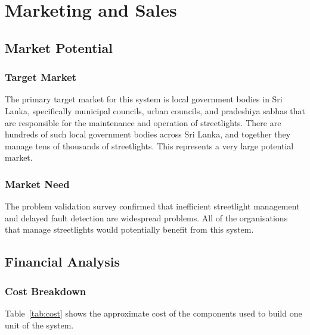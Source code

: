 \section{Marketing and Sales}

\subsection{Market Potential}

\subsubsection{Target Market}

The primary target market for this system is local government bodies in Sri Lanka, specifically municipal councils, urban councils, and pradeshiya sabhas that are responsible for the maintenance and operation of streetlights. There are hundreds of such local government bodies across Sri Lanka, and together they manage tens of thousands of streetlights. This represents a very large potential market.

\subsubsection{Market Need}

The problem validation survey confirmed that inefficient streetlight management and delayed fault detection are widespread problems. All of the organisations that manage streetlights would potentially benefit from this system.

\subsection{Financial Analysis}

\subsubsection{Cost Breakdown}

Table~\ref{tab:cost} shows the approximate cost of the components used to build one unit of the system.

